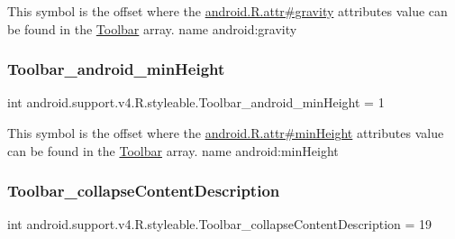 This symbol is the offset where the \hyperlink{}{android.\+R.\+attr\#gravity} attribute\textquotesingle{}s value can be found in the \hyperlink{classandroid_1_1support_1_1v4_1_1R_1_1styleable_a211358a2f951023c7735caea0fb5ae04}{Toolbar} array.  name android\+:gravity \mbox{\label{classandroid_1_1support_1_1v4_1_1R_1_1styleable_a0d3b075d587ebf9dd415672f35ff77a2}} 
\subsubsection{\texorpdfstring{Toolbar\+\_\+android\+\_\+min\+Height}{Toolbar\_android\_minHeight}}
{\footnotesize\ttfamily int android.\+support.\+v4.\+R.\+styleable.\+Toolbar\+\_\+android\+\_\+min\+Height = 1\hspace{0.3cm}{\ttfamily [static]}}

This symbol is the offset where the \hyperlink{}{android.\+R.\+attr\#min\+Height} attribute\textquotesingle{}s value can be found in the \hyperlink{classandroid_1_1support_1_1v4_1_1R_1_1styleable_a211358a2f951023c7735caea0fb5ae04}{Toolbar} array.  name android\+:min\+Height \mbox{\label{classandroid_1_1support_1_1v4_1_1R_1_1styleable_a4cbc87868c5e4c8ff2456bc78168f833}} 
\subsubsection{\texorpdfstring{Toolbar\+\_\+collapse\+Content\+Description}{Toolbar\_collapseContentDescription}}
{\footnotesize\ttfamily int android.\+support.\+v4.\+R.\+styleable.\+Toolbar\+\_\+collapse\+Content\+Description = 19\hspace{0.3cm}{\ttfamily [static]}}


